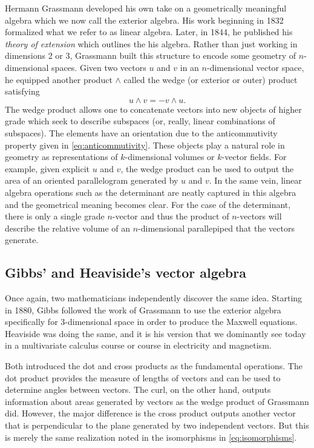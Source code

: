\documentclass[12pt]{article}
\begin{document}
Hermann Grassmann developed his own take on a geometrically meaningful algebra which we now call the exterior algebra. His work beginning in 1832 formalized what we refer to as linear algebra. Later, in 1844, he published his \emph{theory of extension} which outlines the his algebra. Rather than just working in dimensions 2 or 3, Grassmann built this structure to encode some geometry of $n$-dimensional spaces. Given two vectors $u$ and $v$ in an $n$-dimensional vector space, he equipped another product $\wedge$ called the wedge (or exterior or outer) product satisfying
\begin{equation}
\label{eq:anticommutivity}
u \wedge v = - v \wedge u.
\end{equation}
The wedge product allows one to concatenate vectors into new objects of higher grade which seek to describe subspaces (or, really, linear combinations of subspaces). The elements have an orientation due to the anticommutivity property given in \cref{eq:anticommutivity}. These objects play a natural role in geometry as representations of $k$-dimensional volumes or $k$-vector fields. For example, given explicit $u$ and $v$, the wedge product can be used to output the area of an oriented parallelogram generated by $u$ and $v$. In the same vein, linear algebra operations such as the determinant are neatly captured in this algebra and the geometrical meaning becomes clear. For the case of the determinant, there is only a single grade $n$-vector and thus the product of $n$-vectors will describe the relative volume of an $n$-dimensional parallepiped that the vectors generate.

\subsection{Gibbs' and Heaviside's vector algebra}

Once again, two mathematicians independently discover the same idea. Starting in 1880, Gibbs followed the work of Grassmann to use the exterior algebra specifically for 3-dimensional space in order to produce the Maxwell equations. Heaviside was doing the same, and it is his version that we dominantly see today in a multivariate calculus course or course in electricity and magnetism. 

Both introduced the dot and cross products as the fundamental operations. The dot product provides the measure of lengths of vectors and can be used to determine angles between vectors. The curl, on the other hand, outputs information about areas generated by vectors as the wedge product of Grassmann did. However, the major difference is the cross product outputs another vector that is perpendicular to the plane generated by two independent vectors. But this is merely the same realization noted in the isomorphisms in \cref{eq:isomorphisms}.
\end{document}
